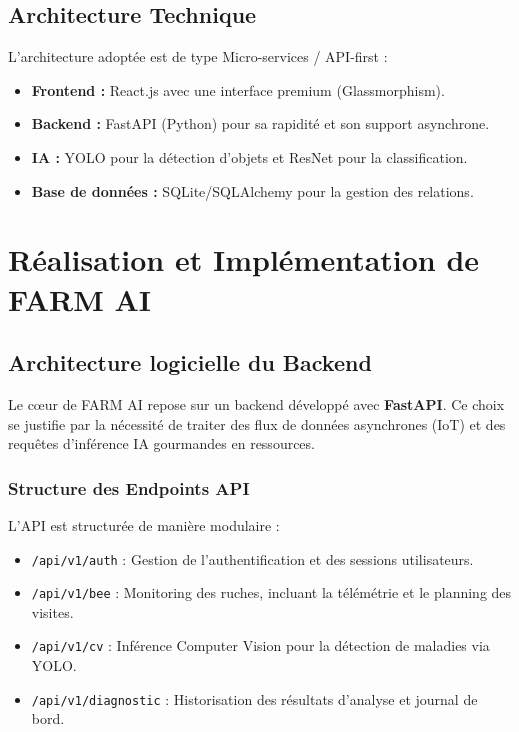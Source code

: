 \documentclass[12pt,a4paper,oneside]{report}
\begin{document}
\section{Architecture Technique}
L'architecture adoptée est de type Micro-services / API-first :
\begin{itemize}
    \item \textbf{Frontend :} React.js avec une interface premium (Glassmorphism).
    \item \textbf{Backend :} FastAPI (Python) pour sa rapidité et son support asynchrone.
    \item \textbf{IA :} YOLO pour la détection d'objets et ResNet pour la classification.
    \item \textbf{Base de données :} SQLite/SQLAlchemy pour la gestion des relations.
\end{itemize}

\chapter{Réalisation et Implémentation de FARM AI}

\section{Architecture logicielle du Backend}
Le cœur de FARM AI repose sur un backend développé avec \textbf{FastAPI}. Ce choix se justifie par la nécessité de traiter des flux de données asynchrones (IoT) et des requêtes d'inférence IA gourmandes en ressources.

\subsection{Structure des Endpoints API}
L'API est structurée de manière modulaire :
\begin{itemize}
    \item \texttt{/api/v1/auth} : Gestion de l'authentification et des sessions utilisateurs.
    \item \texttt{/api/v1/bee} : Monitoring des ruches, incluant la télémétrie et le planning des visites.
    \item \texttt{/api/v1/cv} : Inférence Computer Vision pour la détection de maladies via YOLO.
    \item \texttt{/api/v1/diagnostic} : Historisation des résultats d'analyse et journal de bord.
\end{itemize}
\end{document}

